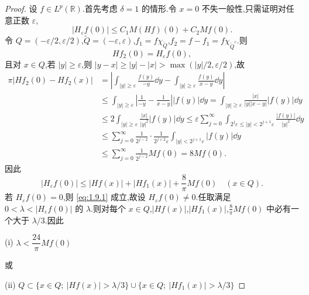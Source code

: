 \begin{proof}
设 $f \in L^{p}(\mathbb{R})$.首先考虑 $\delta = 1$ 的情形.令 $x = 0$ 不失一般性,只需证明对任意正数 $\varepsilon$,
\begin{equation}\tag{1.9.1}
|H_{\varepsilon}f(0)| \leq C_{1}M(Hf)(0) + C_{2}Mf(0).
\label{eq:1.9.1}\end{equation}
令 $Q = (-\varepsilon/2, \varepsilon/2)$,$\tilde{Q} = (-\varepsilon, \varepsilon)$,$f_{1} = f\chi_{\tilde{Q}}$,$f_{2} = f - f_{1} = f\chi_{\tilde{Q}^{c}}$.则
\begin{equation*}
Hf_{2}(0) = H_{\varepsilon}f(0),
\end{equation*}
且对 $x \in Q$,若 $|y| \geq \varepsilon$,则 $|y - x| \geq |y| - |x| > \max(|y|/2, \varepsilon/2)$,故
\begin{align*}
\pi|Hf_{2}(0) - Hf_{2}(x)|&= \left|\displaystyle\int_{|y| \geq \varepsilon}\frac{f(y)}{-y}\dd y - \int_{|y| \geq \varepsilon}\frac{f(y)}{x - y}\dd y\right|  \\
&\leq \displaystyle\int_{|y| \geq \varepsilon}\left|\frac{1}{-y} - \frac{1}{x - y}\right||f(y)|\dd y = \int_{|y| \geq \varepsilon}\frac{|x|}{|y||x - y|}|f(y)|\dd y \\
&\leq 2\displaystyle\int_{|y| \geq \varepsilon}\frac{|x|}{|y|^{2}}|f(y)|\dd y \leq \varepsilon\sum_{j = 0}^{\infty}\int_{2^{j}\varepsilon \leq |y| < 2^{j+1}\varepsilon}\frac{|f(y)|}{|y|^{2}}\dd y \\
&\leq \displaystyle\sum_{j = 0}^{\infty}\frac{1}{2^{j-2}}\cdot\frac{1}{2^{j+2}\varepsilon}\int_{|y| < 2^{j+1}\varepsilon}|f(y)|\dd y \\
&\leq \displaystyle\sum_{j = 0}^{\infty}\frac{1}{2^{j-2}}Mf(0) = 8Mf(0).
\end{align*}
因此
\begin{equation}\tag{1.9.2}
|H_{\varepsilon}f(0)| \leq |Hf(x)| + |Hf_{1}(x)| + \frac{8}{\pi}Mf(0) \quad (x \in Q).
\label{eq:1.9.2}\end{equation}
若 $H_{\varepsilon}f(0) = 0$,则 \eqref{eq:1.9.1} 成立,故设 $H_{\varepsilon}f(0) \neq 0$.任取满足 $0 < \lambda < |H_{\varepsilon}f(0)|$ 的 $\lambda$.则对每个 $x \in Q$,$|Hf(x)|$,$|Hf_{1}(x)|$,$\frac{8}{\pi}Mf(0)$ 中必有一个大于 $\lambda/3$.因此

(i) $\lambda < \dfrac{24}{\pi}Mf(0)$

或

(ii) $Q \subset \{x \in Q;\ |Hf(x)| > \lambda/3\} \cup \{x \in Q;\ |Hf_{1}(x)| > \lambda/3\}$


\end{proof}

